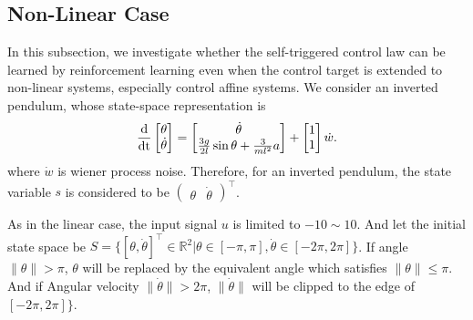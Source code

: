 \documentclass[english, dvipdfmx]{ampmt}             %
\newcommand{\odif}[2]{\frac{\rm{d}#1}{\rm{d}#2}}
\begin{document}
\subsection{Non-Linear Case}
In this subsection, we investigate whether the self-triggered control law can be learned by reinforcement learning even when the control target is extended to non-linear systems, especially control affine systems. We consider an inverted pendulum, whose state-space representation is
\begin{equation}
	\odif{}{t}\begin{bmatrix}\theta \\ \dot{\theta}\end{bmatrix} = 
		\begin{bmatrix}\dot{\theta} \\ \frac{3g}{2l}\sin{\theta} + \frac{3}{ml^2}a \end{bmatrix} + \begin{bmatrix}1 \\ 1\end{bmatrix}\dot{w}\label{pendulum}.
\end{equation}
where $\dot{w}$ is wiener process noise. Therefore, for an inverted pendulum, the state variable $s$ is considered to be $\begin{pmatrix}\theta & \dot{\theta}\end{pmatrix}^{\top}$.
\par
As in the linear case, the input signal $u$ is limited to $-10 \sim 10$. And let the initial state space be $S = \{[\theta, \dot{\theta}]^{\top}\in \mathbb{R}^2| \theta\in[-\pi,\pi], \dot{\theta}\in[-2\pi,2\pi]\}$. 
If angle $\|\theta\| > \pi$, $\theta$ will be replaced by the equivalent angle which satisfies $\|\theta\| \leq \pi$. And if Angular velocity $\|\dot{\theta}\| > 2\pi$, $\|\dot{\theta}\|$ will be clipped to the edge of $[-2\pi,2\pi]\}$.
\fi
\end{document}
